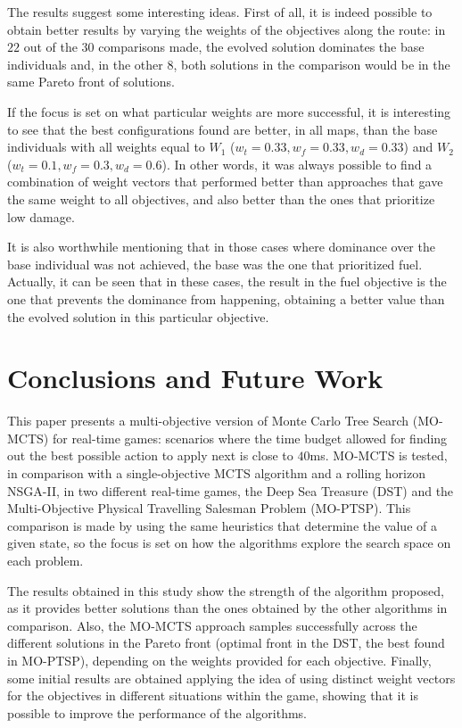 \documentclass[journal]{IEEEtran}
\begin{document}
The results suggest some interesting ideas. First of all, it is indeed possible to obtain better results by varying the weights of the objectives along the route: in $22$ out of the $30$ comparisons made, the evolved solution dominates the base individuals and, in the other $8$, both solutions in the comparison would be in the same Pareto front of solutions. 

If the focus is set on what particular weights are more successful, it is interesting to see that the best configurations found are better, in all maps, than the base individuals with all weights equal to $W_1$ ($w_t = 0.33, w_f = 0.33, w_d = 0.33$) and $W_2$ ($w_t = 0.1, w_f = 0.3, w_d = 0.6$). In other words, it was always possible to find a combination of weight vectors that performed better than approaches that gave the same weight to all objectives, and also better than the ones that prioritize low damage.

It is also worthwhile mentioning that in those cases where dominance over the base individual was not achieved, the base was the one that prioritized fuel. Actually, it can be seen that in these cases, the result in the fuel objective is the one that prevents the dominance from happening, obtaining a better value than the evolved solution in this particular objective.


\section{Conclusions and Future Work} \label{sec:conc}

This paper presents a multi-objective version of Monte Carlo Tree Search (MO-MCTS) for real-time games: scenarios where the time budget allowed for finding out the best possible action to apply next is close to $40$ms. MO-MCTS is tested, in comparison with a single-objective MCTS algorithm and a rolling horizon NSGA-II, in two different real-time games, the Deep Sea Treasure (DST) and the Multi-Objective Physical Travelling Salesman Problem (MO-PTSP). This comparison is made by using the same heuristics that determine the value of a given state, so the focus is set on how the algorithms explore the search space on each problem.

The results obtained in this study show the strength of the algorithm proposed, as it provides better solutions than the ones obtained by the other algorithms in comparison. Also, the MO-MCTS approach samples successfully across the different solutions in the Pareto front (optimal front in the DST, the best found in MO-PTSP), depending on the weights provided for each objective. Finally, some initial results are obtained applying the idea of using distinct weight vectors for the objectives in different situations within the game, showing that it is possible to improve the performance of the algorithms.
\end{document}
